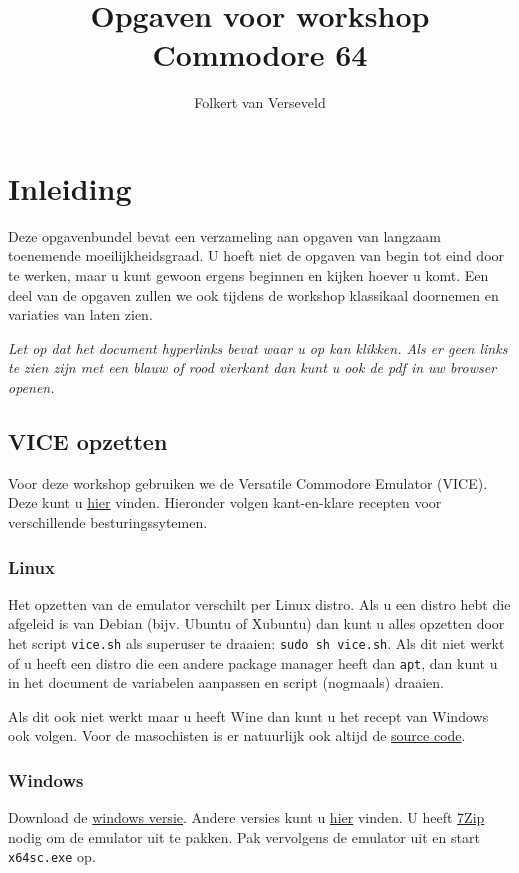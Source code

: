 \documentclass{article}
\title{Opgaven voor workshop Commodore 64}
\author{Folkert van Verseveld}
\begin{document}
\maketitle

\section{Inleiding}

Deze opgavenbundel bevat een verzameling aan opgaven van langzaam toenemende moeilijkheidsgraad.
U hoeft niet de opgaven van begin tot eind door te werken, maar u kunt gewoon ergens beginnen en kijken hoever u komt.
Een deel van de opgaven zullen we ook tijdens de workshop klassikaal doornemen en variaties van laten zien.

\emph{Let op dat het document hyperlinks bevat waar u op kan klikken.
Als er geen links te zien zijn met een blauw of rood vierkant dan kunt u ook de pdf in uw browser openen.}

\subsection{VICE opzetten}
Voor deze workshop gebruiken we de Versatile Commodore Emulator (VICE).
Deze kunt u \href{http://vice-emu.sourceforge.net/}{hier} vinden.
Hieronder volgen kant-en-klare recepten voor verschillende besturingssytemen.

\subsubsection{Linux}
Het opzetten van de emulator verschilt per Linux distro.
Als u een distro hebt die afgeleid is van Debian (bijv. Ubuntu of Xubuntu) dan kunt u alles opzetten door het script \verb:vice.sh: als superuser te draaien:
\verb:sudo sh vice.sh:.
Als dit niet werkt of u heeft een distro die een andere package manager heeft dan \verb:apt:, dan kunt u in het document de variabelen aanpassen en script (nogmaals) draaien.

Als dit ook niet werkt maar u heeft Wine dan kunt u het recept van Windows ook volgen.
Voor de masochisten is er natuurlijk ook altijd de \href{http://sourceforge.net/projects/vice-emu/files/releases/vice-3.1.tar.gz/download}{source code}.

\subsubsection{Windows}
Download de \href{http://sourceforge.net/projects/vice-emu/files/releases/binaries/windows/WinVICE-3.1-x64.7z/download}{windows versie}.
Andere versies kunt u \href{http://vice-emu.sourceforge.net/windows.html}{hier} vinden.
U heeft \href{http://www.7-zip.org/}{7Zip} nodig om de emulator uit te pakken.
Pak vervolgens de emulator uit en start \verb:x64sc.exe: op.
\end{document}
